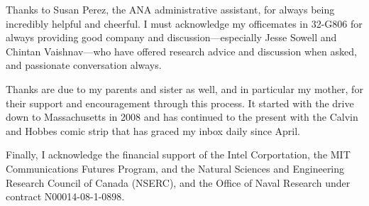 Thanks to Susan Perez, the ANA administrative assistant, for always being
incredibly helpful and cheerful. I must acknowledge my officemates in 32-G806
for always providing good company and discussion---especially Jesse Sowell and
Chintan Vaishnav---who have offered research advice and discussion when
asked, and passionate conversation always.

Thanks are due to my parents and sister as well, and in particular my mother,
for their support and encouragement through this process. It started with the
drive down to Massachusetts in 2008 and has continued to the present with
the Calvin and Hobbes comic strip that has graced my inbox daily since April.

Finally, I acknowledge the financial support of the Intel Corportation, the MIT
Communications Futures Program, and the Natural Sciences and Engineering
Research Council of Canada (NSERC), and the Office of Naval Research under
contract N00014-08-1-0898.

%
%
%
%

